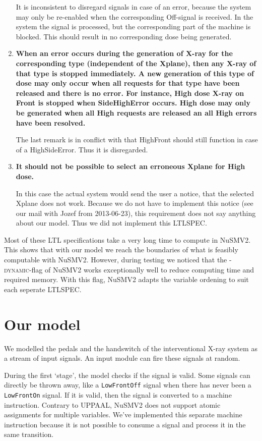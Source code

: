 \documentclass[a4paper,10pt]{article}
\begin{document}
\begin{enumerate}
			It is inconsistent to disregard signals in case of an error, because the system may only be re-enabled when the corresponding Off-signal is received.
			In the system the signal is processed, but the corresponding part of the machine is blocked.
			This should result in no corresponding dose being generated.
		\item
			\textbf{When an error occurs during the generation of X-ray for the corresponding type (independent of the Xplane), then any X-ray of that type is stopped immediately.
			A new generation of this type of dose may only occur when all requests for that type have been released and there is no error.
			For instance, High dose X-ray on Front is stopped when SideHighError occurs.
			High dose may only be generated when all High requests are released an all High errors have been resolved.}
			
			The last remark is in conflict with that HighFront should still function in case of a HighSideError.
			Thus it is disregarded.
		\item	\textbf{It should not be possible to select an erroneous Xplane for High dose.}
			
			In this case the actual system would send the user a notice, that the selected Xplane does not work.
			Because we do not have to implement this notice (see our mail with Jozef from 2013-06-23), this requirement does not say anything about our model.
			Thus we did not implement this LTLSPEC.
	\end{enumerate}
	
	Most of these LTL specifications take a very long time to compute in NuSMV2.
	This shows that with our model we reach the boundaries of what is feasibly computable with NuSMV2.
	However, during testing we noticed that the \textsc{-dynamic}-flag of NuSMV2 works exceptionally well to reduce computing time and required memory.
	With this flag, NuSMV2 adapts the variable ordening to suit each seperate LTLSPEC.
	
	\section{Our model}
	We modelled the pedals and the handswitch of the interventional X-ray system as a stream of input signals.
	An input module can fire these signals at random.
	
	During the first `stage', the model checks if the signal is valid.
	Some signals can directly be thrown away, like a \texttt{LowFrontOff} signal when there has never been a \texttt{LowFrontOn} signal.
	If it is valid, then the signal is converted to a machine instruction.
	Contrary to UPPAAL, NuSMV2 does not support atomic assignments for multiple variables.
	We've implemented this separate machine instruction because it is not possible to consume a signal and process it in the same transition.
	
\end{document}
